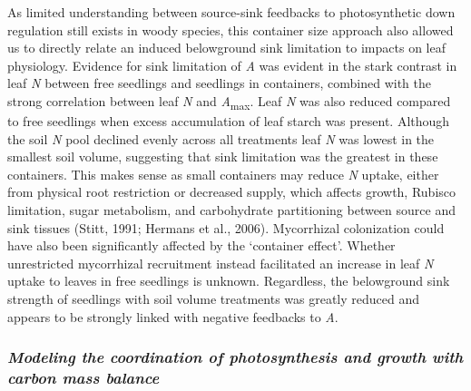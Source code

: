 \documentclass[a4paper]{article}\usepackage[]{graphicx}\usepackage[]{color}
\begin{document}
As limited understanding between source-sink feedbacks to photosynthetic down regulation still exists in woody species, this container size approach also allowed us to directly relate an induced belowground sink limitation to impacts on leaf physiology. Evidence for sink limitation of \textit{A} was evident in the stark contrast in leaf \textit{N} between free seedlings and seedlings in containers, combined with the strong correlation between leaf \textit{N} and \textit{A}\textsubscript{max}. Leaf \textit{N} was also reduced compared to free seedlings when excess accumulation of leaf starch was present. Although the soil \textit{N} pool declined evenly across all treatments leaf \textit{N} was lowest in the smallest soil volume, suggesting that sink limitation was the greatest in these containers. This makes sense as small containers may reduce \textit{N} uptake, either from physical root restriction or decreased supply, which affects growth, Rubisco limitation, sugar metabolism, and carbohydrate partitioning between source and sink tissues (Stitt, 1991; Hermans et al., 2006). Mycorrhizal colonization could have also been significantly affected by the ‘container effect’. Whether unrestricted mycorrhizal recruitment instead facilitated an increase in leaf \textit{N} uptake to leaves in free seedlings is unknown. Regardless, the belowground sink strength of seedlings with soil volume treatments was greatly reduced and appears to be strongly linked with negative feedbacks to \textit{A}.

\subsubsection*{\textit{Modeling the coordination of photosynthesis and growth with carbon mass balance}}
\end{document}
